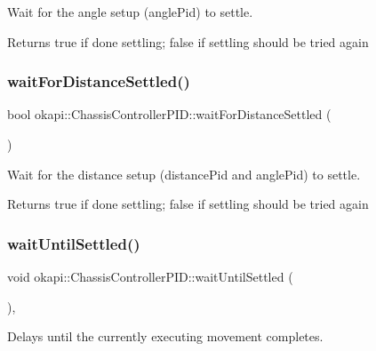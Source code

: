 Wait for the angle setup (angle\+Pid) to settle.

\begin{DoxyReturn}{Returns}
true if done settling; false if settling should be tried again 
\end{DoxyReturn}
\mbox{\label{classokapi_1_1ChassisControllerPID_a991349bc2dad71324203d4b298edd845}} 
\subsubsection{\texorpdfstring{waitForDistanceSettled()}{waitForDistanceSettled()}}
{\footnotesize\ttfamily bool okapi\+::\+Chassis\+Controller\+P\+I\+D\+::wait\+For\+Distance\+Settled (\begin{DoxyParamCaption}{ }\end{DoxyParamCaption})\hspace{0.3cm}{\ttfamily [protected]}}

Wait for the distance setup (distance\+Pid and angle\+Pid) to settle.

\begin{DoxyReturn}{Returns}
true if done settling; false if settling should be tried again 
\end{DoxyReturn}
\mbox{\label{classokapi_1_1ChassisControllerPID_a964cc8132bfa76492df0ee06aadb255a}} 
\subsubsection{\texorpdfstring{waitUntilSettled()}{waitUntilSettled()}}
{\footnotesize\ttfamily void okapi\+::\+Chassis\+Controller\+P\+I\+D\+::wait\+Until\+Settled (\begin{DoxyParamCaption}{ }\end{DoxyParamCaption})\hspace{0.3cm}{\ttfamily [override]}, {\ttfamily [virtual]}}

Delays until the currently executing movement completes. 

